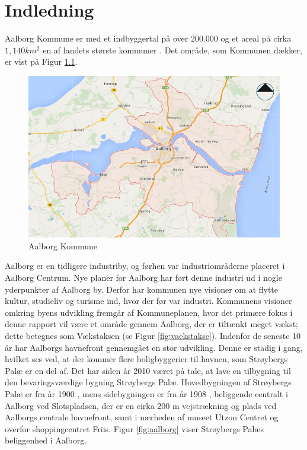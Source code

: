 \chapter{Indledning}
Aalborg Kommune er med et indbyggertal på over 200.000 og et areal på cirka  $1,\!140 km^2$ en af landets største kommuner \citep{kommunedata}. Det område, som Kommunen dækker, er vist på Figur \ref{fig:aalborgkommune}. 

\begin{figure}[htbp]
	\includegraphics[width=1.0\textwidth]{billeder/aalborgkommune.png}
	\caption{Aalborg Kommune}
	\label{fig:aalborgkommune}
\end{figure}

Aalborg er en tidligere industriby, og førhen var industriområderne placeret i Aalborg Centrum. Nye planer for Aalborg har ført denne industri ud i nogle yderpunkter af Aalborg by. Derfor har kommunen nye visioner om at flytte kultur, studieliv og turisme ind, hvor der før var industri. Kommunens visioner omkring byens udvikling fremgår af Kommuneplanen, hvor det primære fokus i denne rapport vil være et område gennem Aalborg, der er tiltænkt meget vækst; dette betegnes som Vækstaksen (se Figur \ref{fig:vaekstakse}).
\newline \indent{     }  Indenfor de seneste 10 år har Aalborgs havnefront gennemgået en stor udvikling. Denne er stadig i gang, hvilket ses ved, at der kommer flere boligbyggerier til havnen, som Strøybergs Palæ er en del af. 
\newline \indent{     }  Det har siden år 2010 været på tale, at lave en tilbygning til den bevaringsværdige bygning Strøybergs Palæ. Hovedbygningen af Strøybergs Palæ er fra år 1900 \citep{hovedbygning}, mens sidebygningen er fra år 1908 \citep{sidebygning}, beliggende centralt i Aalborg ved Slotspladsen, der er en cirka 200 m vejstrækning og plads ved Aalborgs centrale havnefront, samt i nærheden af museet Utzon Centret og overfor shoppingcentret Friis. Figur \ref{fig:aalborg} viser Strøybergs Palæs beliggenhed i Aalborg. 


